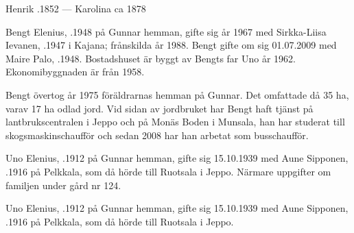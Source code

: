 Henrik .1852  ---  Karolina \textdied ca 1878



%



%
Bengt Elenius, .1948 på Gunnar hemman, gifte sig år 1967 med Sirkka-Liisa Ievanen, .1947 i Kajana; frånskilda år 1988. Bengt gifte om sig 01.07.2009 med Maire Palo, .1948. Bostadshuset är byggt av Bengts far Uno år 1962. Ekonomibyggnaden är från 1958.
\begin{jhchildren}
  \item {}
  \item {}
  \item {}
\end{jhchildren}

Bengt övertog år 1975 föräldrarnas hemman på Gunnar. Det omfattade då 35 ha, varav 17 ha odlad jord. Vid sidan av jordbruket har Bengt haft tjänst på lantbrukscentralen i Jeppo och på Monäs Boden i Munsala, han har studerat till skogsmaskinschaufför och sedan 2008 har han arbetat som busschaufför.


%
Uno Elenius, .1912 på Gunnar hemman, gifte sig 15.10.1939 med Aune Sipponen, .1916 på Pelkkala, som då hörde till Ruotsala i Jeppo. Närmare uppgifter om familjen under gård nr 124.


%


%
Uno Elenius, .1912 på Gunnar hemman, gifte sig 15.10.1939 med Aune Sipponen, .1916 på Pelkkala, som då hörde till Ruotsala i Jeppo.
\begin{jhchildren}
  \item {}
  \item {}
  \item {}
  \item {}
\end{jhchildren}

